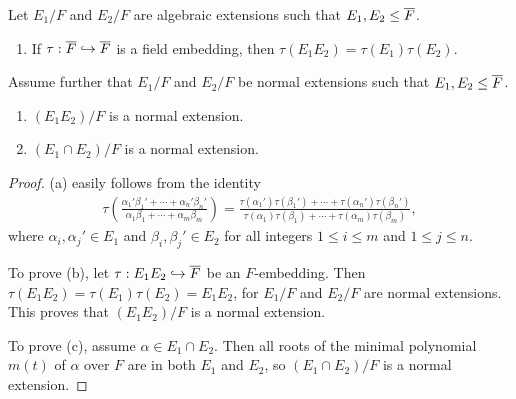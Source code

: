 \begin{prop}
    Let $E_1/F$ and $E_2/F$ are algebraic extensions such that $E_1, E_2\leq\overline{F}$.
    \begin{enumerate}
        \item[(a)]
        {
            If $\tau: \overline{F}\hookrightarrow \overline{F}$ is a field embedding, then $\tau(E_1E_2)=\tau(E_1)\tau(E_2)$.
        }
    \end{enumerate}
    Assume further that $E_1/F$ and $E_2/F$ be normal extensions such that $E_1, E_2\leq\overline{F}$.
    \begin{enumerate}
        \item[(b)]
        {
            $(E_1E_2)/F$ is a normal extension.
        }
        \item[(c)]
        {
            $(E_1\cap E_2)/F$ is a normal extension.
        }
    \end{enumerate}
\end{prop}
\begin{proof}
    (a) easily follows from the identity
    \begin{align*}
        \tau\left(\frac{\alpha_1'\beta_1'+\cdots+\alpha_n'\beta_n'}{\alpha_1\beta_1+\cdots+\alpha_m\beta_m}\right)
        =
        \frac{\tau(\alpha_1')\tau(\beta_1')+\cdots+\tau(\alpha_n')\tau(\beta_n')}{\tau(\alpha_1)\tau(\beta_1)+\cdots+\tau(\alpha_m)\tau(\beta_m)},
    \end{align*}
    where $\alpha_i, \alpha_j'\in E_1$ and $\beta_i, \beta_j'\in E_2$ for all integers $1\leq i\leq m$ and $1\leq j\leq n$.

    To prove (b), let $\tau: E_1E_2\hookrightarrow\overline{F}$ be an $F$-embedding.
    Then $\tau(E_1E_2)=\tau(E_1)\tau(E_2)=E_1E_2$, for $E_1/F$ and $E_2/F$ are normal extensions.
    This proves that $(E_1E_2)/F$ is a normal extension.

    To prove (c), assume $\alpha\in E_1\cap E_2$.
    Then all roots of the minimal polynomial $m(t)$ of $\alpha$ over $F$ are in both $E_1$ and $E_2$, so $(E_1\cap E_2)/F$ is a normal extension.
\end{proof}


